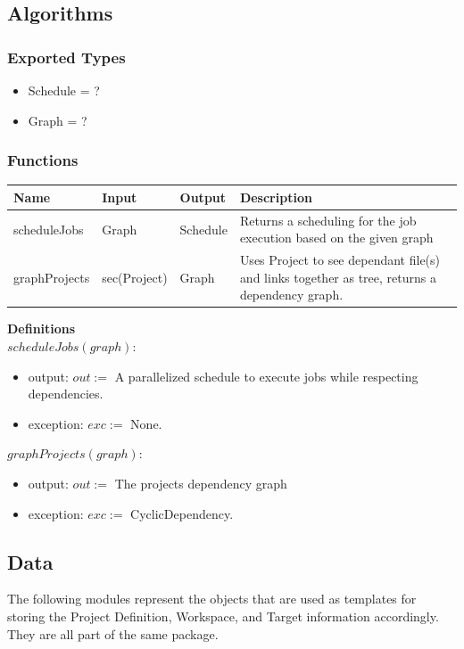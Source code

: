 \documentclass[11pt]{article}
\begin{document}
\subsection{Algorithms}
\label{mod:alg}
\subsubsection{Exported Types}
\begin{itemize}
\item Schedule = ?
\item Graph = ?
\end{itemize}
\subsubsection{Functions}
\begin{tabular}{l | l | l | p{7cm} }
  \textbf{Name} & \textbf{Input} & \textbf{Output} & \textbf{Description} \\
  \hline
  scheduleJobs & Graph & Schedule & Returns a scheduling for the job execution based on the given graph \\
  \hline
  graphProjects & sec(Project) & Graph & Uses Project to see dependant file(s) and links together as tree, returns
                                         a dependency graph. \\
\end{tabular}

\vspace{2em}
\textbf{Definitions}\\

$scheduleJobs(graph):$
\begin{itemize}
\item output: $out :=$ A parallelized schedule to execute jobs while
  respecting dependencies.
\item exception: $exc :=$ None.
\end{itemize}

\vspace{1em}
$graphProjects(graph):$
\begin{itemize}
\item output: $out :=$ The projects dependency graph
\item exception: $exc :=$ CyclicDependency.
\end{itemize}
\subsection{Data}
\label{mod:data}
The following modules represent the objects that are used as templates for storing the Project Definition, Workspace, and Target information accordingly. They are all part of the same package.
\end{document}

